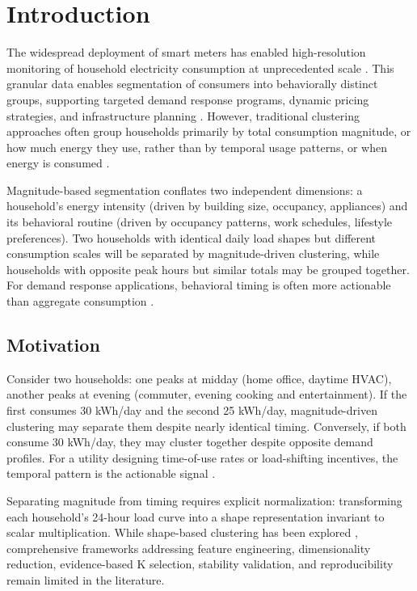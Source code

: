 \documentclass[11pt,a4paper]{article}
\begin{document}
\section{Introduction}
\label{sec:introduction}

The widespread deployment of smart meters has enabled high-resolution monitoring of household electricity consumption at unprecedented scale \cite{lazar2021investigating,kwac2014household}. This granular data enables segmentation of consumers into behaviorally distinct groups, supporting targeted demand response programs, dynamic pricing strategies, and infrastructure planning \cite{yan2021multiple,abdullah2025ml}. However, traditional clustering approaches often group households primarily by total consumption magnitude, or how much energy they use, rather than by temporal usage patterns, or when energy is consumed \cite{jin2016loadshape,rhodes2014clustering}.

Magnitude-based segmentation conflates two independent dimensions: a household's energy intensity (driven by building size, occupancy, appliances) and its behavioral routine (driven by occupancy patterns, work schedules, lifestyle preferences). Two households with identical daily load shapes but different consumption scales will be separated by magnitude-driven clustering, while households with opposite peak hours but similar totals may be grouped together. For demand response applications, behavioral timing is often more actionable than aggregate consumption \cite{haben2016analysis}.

\subsection{Motivation}

Consider two households: one peaks at midday (home office, daytime HVAC), another peaks at evening (commuter, evening cooking and entertainment). If the first consumes 30 kWh/day and the second 25 kWh/day, magnitude-driven clustering may separate them despite nearly identical timing. Conversely, if both consume 30 kWh/day, they may cluster together despite opposite demand profiles. For a utility designing time-of-use rates or load-shifting incentives, the temporal pattern is the actionable signal \cite{afzalan2020twostage,valdes2021smart}.

Separating magnitude from timing requires explicit normalization: transforming each household's 24-hour load curve into a shape representation invariant to scalar multiplication. While shape-based clustering has been explored \cite{rahayu2021shape,jin2016loadshape}, comprehensive frameworks addressing feature engineering, dimensionality reduction, evidence-based K selection, stability validation, and reproducibility remain limited in the literature.
\end{document}
